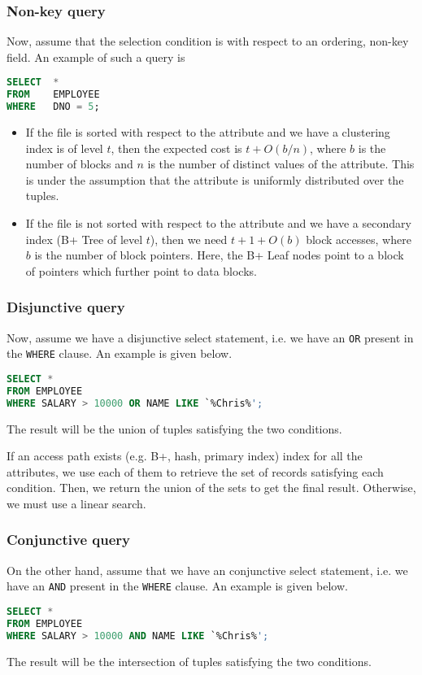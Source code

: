 \documentclass[a4paper, openany]{memoir}
\theoremstyle{definition}
\theoremstyle{plain}
\begin{document}
\subsubsection{Non-key query}
Now, assume that the selection condition is with respect to an ordering, non-key field. An example of such a query is
\begin{lstlisting}[language=SQL]
SELECT  *
FROM    EMPLOYEE
WHERE   DNO = 5;
\end{lstlisting}
\begin{itemize}
    \item If the file is sorted with respect to the attribute and we have a clustering index is of level $t$, then the expected cost is $t + O(b/n)$, where $b$ is the number of blocks and $n$ is the number of distinct values of the attribute. This is under the assumption that the attribute is uniformly distributed over the tuples.
    \item If the file is not sorted with respect to the attribute and we have a secondary index (B+ Tree of level $t$), then we need $t + 1 + O(b)$ block accesses, where $b$ is the number of block pointers. Here, the B+ Leaf nodes point to a block of pointers which further point to data blocks.
\end{itemize}

\subsubsection{Disjunctive query}
Now, assume we have a disjunctive select statement, i.e. we have an \texttt{OR} present in the \texttt{WHERE} clause. An example is given below.
\begin{lstlisting}[language=SQL]
SELECT * 
FROM EMPLOYEE 
WHERE SALARY > 10000 OR NAME LIKE `%Chris%';
\end{lstlisting}
The result will be the union of tuples satisfying the two conditions. 

If an access path exists (e.g. B+, hash, primary index) index for all the attributes, we use each of them to retrieve the set of records satisfying each condition. Then, we return the union of the sets to get the final result. Otherwise, we must use a linear search.

\subsubsection{Conjunctive query}
On the other hand, assume that we have an conjunctive select statement, i.e. we have an \texttt{AND} present in the \texttt{WHERE} clause. An example is given below.
\begin{lstlisting}[language=SQL]
SELECT * 
FROM EMPLOYEE 
WHERE SALARY > 10000 AND NAME LIKE `%Chris%';
\end{lstlisting}
The result will be the intersection of tuples satisfying the two conditions. 
\end{document}
